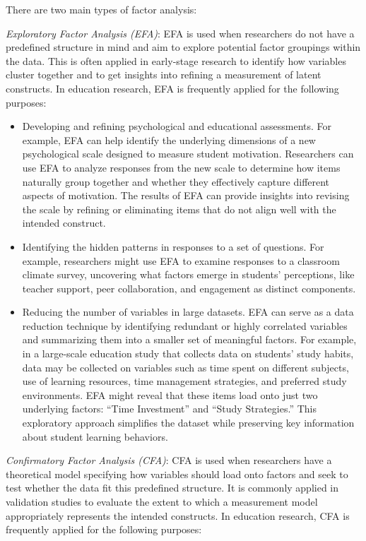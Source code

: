 \documentclass[
  letterpaper,
  DIV=11,
  numbers=noendperiod]{scrreprt}
\begin{document}
There are two main types of factor analysis:

\emph{Exploratory Factor Analysis (EFA)}: EFA is used when researchers
do not have a predefined structure in mind and aim to explore potential
factor groupings within the data. This is often applied in early-stage
research to identify how variables cluster together and to get insights
into refining a measurement of latent constructs. In education research,
EFA is frequently applied for the following purposes:

\begin{itemize}
\item
  Developing and refining psychological and educational assessments. For
  example, EFA can help identify the underlying dimensions of a new
  psychological scale designed to measure student motivation.
  Researchers can use EFA to analyze responses from the new scale to
  determine how items naturally group together and whether they
  effectively capture different aspects of motivation. The results of
  EFA can provide insights into revising the scale by refining or
  eliminating items that do not align well with the intended construct.
\item
  Identifying the hidden patterns in responses to a set of questions.
  For example, researchers might use EFA to examine responses to a
  classroom climate survey, uncovering what factors emerge in students'
  perceptions, like teacher support, peer collaboration, and engagement
  as distinct components.
\item
  Reducing the number of variables in large datasets. EFA can serve as a
  data reduction technique by identifying redundant or highly correlated
  variables and summarizing them into a smaller set of meaningful
  factors. For example, in a large-scale education study that collects
  data on students' study habits, data may be collected on variables
  such as time spent on different subjects, use of learning resources,
  time management strategies, and preferred study environments. EFA
  might reveal that these items load onto just two underlying factors:
  ``Time Investment'' and ``Study Strategies.'' This exploratory
  approach simplifies the dataset while preserving key information about
  student learning behaviors.
\end{itemize}

\emph{Confirmatory Factor Analysis (CFA)}: CFA is used when researchers
have a theoretical model specifying how variables should load onto
factors and seek to test whether the data fit this predefined structure.
It is commonly applied in validation studies to evaluate the extent to
which a measurement model appropriately represents the intended
constructs. In education research, CFA is frequently applied for the
following purposes:
\end{document}
